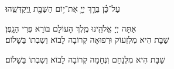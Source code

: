 עַל־כֵּ֗ן בֵּרַ֧ךְ יְיָ֛ אֶת־י֥וֹם הַשַּׁבָּ֖ת וַֽיְקַדְּשֵֽׁהוּ׃

\savri
{}
אַתָּה יְיָ אֱלֹהֵֽינוּ מֶֽלֶךְ הָעוֹלָם בּוֹרֵא פְּרִי הַגָֽפֶן׃\\

שַׁבָּת הִיא מִלִּזְעוֹק וּרְפוּאָה קְרוֹבָה לָבוֹא וְשִבְתוֹ בַּשָׁלוֹם׃

שַׁבָּת הִיא מִלְּנַחֵם וְנֶחָמָה קְרוֹבָה לָבוֹא וְשִבְתוֹ בַּשָׁלוֹם׃